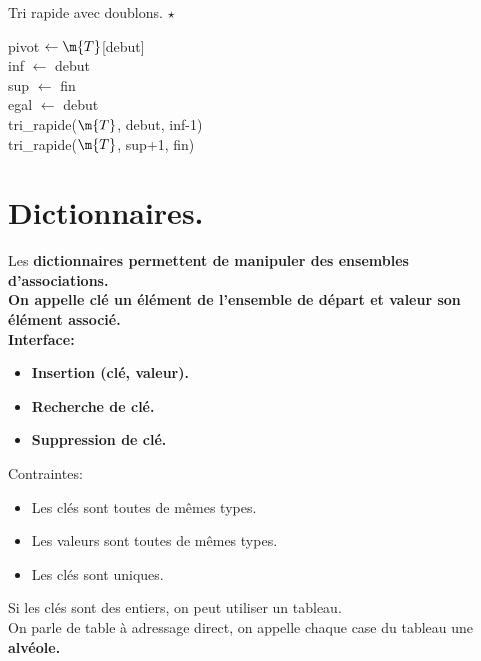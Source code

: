 \documentclass[french, 11pt]{article}
\begin{document}
\begin{defi}{Tri rapide avec doublons. $\star$}{}
    \begin{algorithm}[H]
        \caption{Tri rapide avec doublons}
        pivot $\gets \m{T}$[debut]\\
        inf $\gets$ debut\\
        sup $\gets$ fin\\
        egal $\gets$ debut\\
        tri\_rapide($\m{T}$, debut, inf-1)\\
        tri\_rapide($\m{T}$, sup+1, fin)
    \end{algorithm}
\end{defi}

\section{Dictionnaires.}

\begin{defi}{}{}
    Les \bf{dictionnaires} permettent de manipuler des ensembles d'associations.\\
    On appelle \bf{clé} un élément de l'ensemble de départ et \bf{valeur} son élément associé.\\
    Interface:
    \begin{itemize}[topsep=0pt,itemsep=-0.9 ex]
        \item \bf{Insertion} (clé, valeur).
        \item \bf{Recherche} de clé.
        \item \bf{Suppression} de clé.
    \end{itemize}
    Contraintes:
    \begin{itemize}[topsep=0pt,itemsep=-0.9 ex]
        \item Les clés sont toutes de mêmes types.
        \item Les valeurs sont toutes de mêmes types.
        \item Les clés sont uniques.
    \end{itemize}
    Si les clés sont des entiers, on peut utiliser un tableau.\\
    On parle de table à adressage direct, on appelle chaque case du tableau une \bf{alvéole}.
\end{defi}
\end{document}
